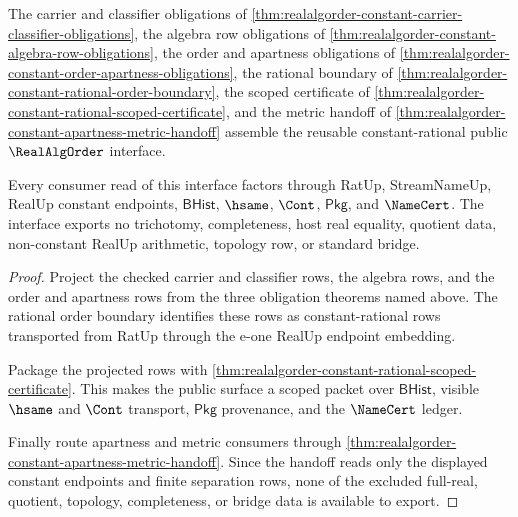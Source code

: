 \begin{theorem}
\label{thm:realalgorder-constant-public-interface-export}
The carrier and classifier obligations of
\autoref{thm:realalgorder-constant-carrier-classifier-obligations}, the
algebra row obligations of
\autoref{thm:realalgorder-constant-algebra-row-obligations}, the order and
apartness obligations of
\autoref{thm:realalgorder-constant-order-apartness-obligations}, the rational
boundary of \autoref{thm:realalgorder-constant-rational-order-boundary}, the
scoped certificate of
\autoref{thm:realalgorder-constant-rational-scoped-certificate}, and the metric
handoff of \autoref{thm:realalgorder-constant-apartness-metric-handoff}
assemble the reusable constant-rational public $\RealAlgOrder$ interface.

Every consumer read of this interface factors through RatUp,
StreamNameUp, RealUp constant endpoints, $\mathsf{BHist}$, $\hsame$,
$\Cont$, $\mathsf{Pkg}$, and $\NameCert$. The interface exports no
trichotomy, completeness, host real equality, quotient data, non-constant
RealUp arithmetic, topology row, or standard bridge.
\end{theorem}
\begin{proof}
Project the checked carrier and classifier rows, the algebra rows, and the
order and apartness rows from the three obligation theorems named above. The
rational order boundary identifies these rows as constant-rational rows
transported from RatUp through the e-one RealUp endpoint embedding.

Package the projected rows with
\autoref{thm:realalgorder-constant-rational-scoped-certificate}. This makes
the public surface a scoped packet over $\mathsf{BHist}$, visible $\hsame$ and
$\Cont$ transport, $\mathsf{Pkg}$ provenance, and the $\NameCert$ ledger.

Finally route apartness and metric consumers through
\autoref{thm:realalgorder-constant-apartness-metric-handoff}. Since the
handoff reads only the displayed constant endpoints and finite separation
rows, none of the excluded full-real, quotient, topology, completeness, or
bridge data is available to export.
\end{proof}

